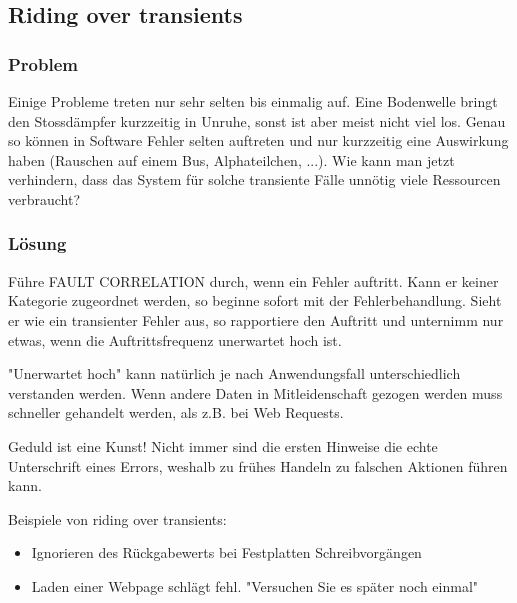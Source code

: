 \subsection{Riding over transients}


\subsubsection*{Problem}


Einige Probleme treten nur sehr selten bis einmalig auf. Eine Bodenwelle bringt den Stossdämpfer kurzzeitig in Unruhe, sonst ist aber meist nicht viel los. Genau so können in Software Fehler selten auftreten und nur kurzzeitig eine Auswirkung haben (Rauschen auf einem Bus, Alphateilchen, ...). Wie kann man jetzt verhindern, dass das System für solche transiente Fälle unnötig viele Ressourcen verbraucht?

\subsubsection*{Lösung}


Führe FAULT CORRELATION durch, wenn ein Fehler auftritt. Kann er keiner Kategorie zugeordnet werden, so beginne sofort mit der Fehlerbehandlung. Sieht er wie ein transienter Fehler aus, so rapportiere den Auftritt und unternimm nur etwas, wenn die Auftrittsfrequenz unerwartet hoch ist.

"Unerwartet hoch" kann natürlich je nach Anwendungsfall unterschiedlich verstanden werden. Wenn andere Daten in Mitleidenschaft gezogen werden muss schneller gehandelt werden, als z.B. bei Web Requests.

Geduld ist eine Kunst! Nicht immer sind die ersten Hinweise die echte Unterschrift eines Errors, weshalb zu frühes Handeln zu falschen Aktionen führen kann.

Beispiele von riding over transients:
\begin{itemize}
	\item Ignorieren des Rückgabewerts bei Festplatten Schreibvorgängen
	\item Laden einer Webpage schlägt fehl. "Versuchen Sie es später noch einmal"
\end{itemize}

